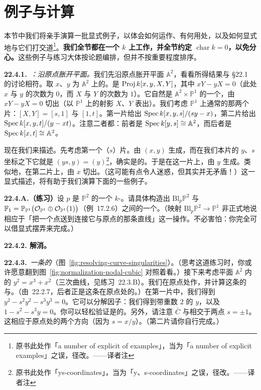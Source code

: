 
\section{例子与计算}

本节中我们将亲手演算一批显式例子，以体会\trBlowup{}如何运作、有何用处，以及如何显式地与它们打交道\footnote{原书此处作「a number of explicit of examples」，当为「a number of explicit examples」之误，径改。——译者注}。\textbf{我们全节都在一个\trField{} $k$ 上工作，并全节约定 $\operatorname{char}k=0$，以免分心。}这些例子与练习大体按论题编排，但并不按重要程度排序。

\textbf{22.4.1.}\ \emph{\trhExample{}：沿原点胀开平面。}\quad 我们先沿原点胀开平面 $\mathbb{A}^2$，看看所得结果与 \S22.1 的讨论相符。取 $x$、$y$ 为 $\mathbb{A}^2$ 上的\trCoordinate。\trBlowup{}是 $\operatorname{Proj} k[x,y,X,Y]$，其中 $xY-yX=0$（此处 $x$ 与 $y$ 的次数为 $0$，而 $X$ 与 $Y$ 的次数为 $1$）。它自然是 $\mathbb{A}^2\times\mathbb{P}^1$ 的一个\trClosedSubscheme，由 $xY-yX=0$ 切出（以 $\mathbb{P}^1$ 上的射影\trCoordinate{} $X$、$Y$ 表出）。我们考虑 $\mathbb{P}^1$ 上通常的那两个片：$[X,Y]=[s,1]$ 与 $[1,t]$。第一片给出 $\operatorname{Spec} k[x,y,s]/(sy-x)$，第二片给出 $\operatorname{Spec} k[x,y,t]/(y-xt)$。注意二者都\trSmooth：前者是 $\operatorname{Spec} k[y,s]\cong\mathbb{A}^2$，而后者是 $\operatorname{Spec} k[x,t]\cong\mathbb{A}^2$。

现在我们来描述\trExceptionalDivisor。先考虑第一个（$s$）片。\trIdeal{}由 $(x,y)$ 生成，而在我们本片的 $y$、$s$ 坐标之下它就是 $(ys,y)=(y)$\footnote{原书此处作「ys-coordinates」，当为「y、s-coordinates」之误，径改。——译者注}，确实是\trPrincipal{}的。于是在这一片上，\trExceptionalDivisor{}由 $y$ 生成。类似地，在第二片上，\trExceptionalDivisor{}由 $x$ 切出。（这可能有点令人迷惑，但其实并无矛盾！）这一显式描述，将有助于我们演算下面的一些例子。

\textbf{22.4.A.（练习）}\quad 设 $p$ 是 $\mathbb{P}^2$ 的一个 $k$-\trValuedPoint。请具体构造出 $\mathrm{Bl}_p\mathbb{P}^2$ 与\trHirzebruchSurface{} $\mathbb{F}_1=\mathbb{P}_{\mathbb{P}^1}\bigl(\mathcal{O}_{\mathbb{P}^1}\oplus\mathcal{O}_{\mathbb{P}^1}(1)\bigr)$（\mbox{例~17.2.6}）之间的一个\trIsomorphism。（映射 $\mathrm{Bl}_p\mathbb{P}^2\to\mathbb{P}^1$ 非正式地说相应于「把一个点送到连接它与原点的那条直线」这一操作。不必害怕：你完全可以借显式摆弄\trCoordinate{}来完成。）

\textbf{22.4.2. 解消\trSingularPoint。}

\textbf{22.4.3.}\ \emph{一条\trNode{}\trCurve{}的\trProperTransform}（图~\ref{fig:resolving-curve-singularities}）。\quad （思考这道练习时，你或许愿意翻到图~\ref{fig:normalization-nodal-cubic} 对照着看。）接下来考虑平面 $\mathbb{A}^2$ 内的\trCurve{} $y^2=x^3+x^2$（\trNode{}三次曲线，见\mbox{练习~22.3.B}）。我们在原点处作\trBlowup，并计算这条\trCurve{}的\trTotalTransform{}与\trProperTransform。（由\mbox{\trBlowupClosureLemma~22.2.7}，后者正是这条\trNode{}\trCurve{}在原点处的\trBlowup。）在第一片中，我们得到 $y^2-s^2y^2-s^3y^3=0$。它可以分解因子：我们得到带重数 $2$ 的\trExceptionalDivisor{} $y$，以及\trCurve{} $1-s^2-s^3y=0$。你可以轻松验证\trProperTransform{}是\trRegular{}的。另外，请注意\trProperTransform{} $\bar{C}$ 与\trExceptionalDivisor{}相交于两点 $s=\pm 1$。这相应于原点处的两个\trTangentLine{}方向（因为 $s=x/y$）。（第二片请你自行完成。）

